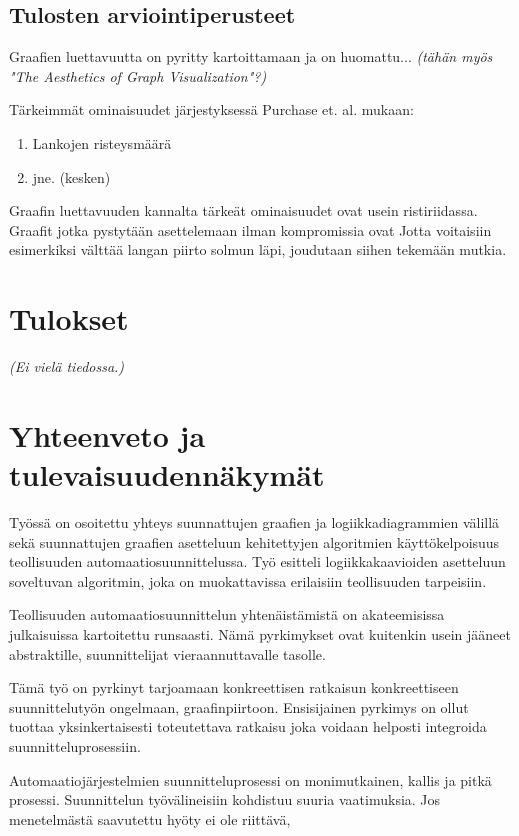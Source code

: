 \documentclass[finnish,12pt]{article}
\begin{document}
		\subsection{Tulosten arviointiperusteet}



Graafien luettavuutta on pyritty kartoittamaan ja on huomattu... \cite{RefWorks:47}
\emph{(tähän myös "The Aesthetics of Graph Visualization"?)}

Tärkeimmät ominaisuudet järjestyksessä Purchase et. al. mukaan: 
\begin{enumerate}
  \item Lankojen risteysmäärä
  \item jne. (kesken)
\end{enumerate}

Graafin luettavuuden kannalta tärkeät ominaisuudet ovat usein ristiriidassa.
Graafit jotka pystytään asettelemaan ilman kompromissia ovat 
Jotta voitaisiin esimerkiksi välttää langan piirto solmun läpi, joudutaan siihen tekemään mutkia.


	\clearpage
	\section{Tulokset}
	
\emph{(Ei vielä tiedossa.)}

	\section{Yhteenveto ja tulevaisuudennäkymät}

Työssä on osoitettu yhteys suunnattujen graafien ja logiikkadiagrammien välillä sekä suunnattujen graafien asetteluun kehitettyjen algoritmien käyttökelpoisuus teollisuuden automaatiosuunnittelussa.
Työ esitteli logiikkakaavioiden asetteluun soveltuvan algoritmin, joka on muokattavissa erilaisiin teollisuuden tarpeisiin.

Teollisuuden automaatiosuunnittelun yhtenäistämistä on akateemisissa julkaisuissa kartoitettu runsaasti.
Nämä pyrkimykset ovat kuitenkin usein jääneet abstraktille, suunnittelijat vieraannuttavalle tasolle.

Tämä työ on pyrkinyt tarjoamaan konkreettisen ratkaisun konkreettiseen suunnittelutyön ongelmaan, graafinpiirtoon.
Ensisijainen pyrkimys on ollut tuottaa yksinkertaisesti toteutettava ratkaisu joka voidaan helposti integroida suunnitteluprosessiin.

Automaatiojärjestelmien suunnitteluprosessi on monimutkainen, kallis ja pitkä prosessi.
Suunnittelun työvälineisiin kohdistuu suuria vaatimuksia.
Jos menetelmästä saavutettu hyöty ei ole riittävä,
\end{document}
